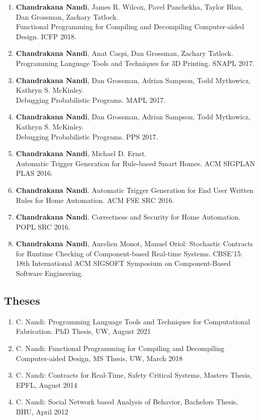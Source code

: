 \documentclass[margin, 10pt]{res} %
\begin{document}
\begin{resume}
\begin{enumerate}
  \item \textbf{Chandrakana Nandi}, James R. Wilcox, Pavel Panchekha, Taylor Blau, Dan Grossman, Zachary Tatlock. \\
    Functional Programming for Compiling and Decompiling Computer-aided Design. ICFP 2018.
  \item \textbf{Chandrakana Nandi}, Anat Caspi, Dan Grossman, Zachary Tatlock. \\
    Programming Language Tools and Techniques for 3D Printing. SNAPL 2017.

  \item \textbf{Chandrakana Nandi}, Dan Grossman, Adrian Sampson, Todd Mytkowicz, Kathryn S. McKinley. \\ Debugging Probabilistic Programs. MAPL 2017.
  \item \textbf{Chandrakana Nandi}, Dan Grossman, Adrian Sampson, Todd Mytkowicz, Kathryn S. McKinley. \\ Debugging Probabilistic Programs. PPS 2017.
\item \textbf{Chandrakana Nandi}, Michael D. Ernst. \\ Automatic Trigger Generation for Rule-based Smart Homes. ACM SIGPLAN PLAS 2016.
\item \textbf{Chandrakana Nandi}. Automatic Trigger Generation for End User Written Rules for Home Automation. ACM FSE SRC 2016.
\item \textbf{Chandrakana Nandi}. Correctness and Security for Home Automation. POPL SRC 2016.
\item \textbf{Chandrakana Nandi}, Aurelien Monot, Manuel Oriol: Stochastic Contracts for Runtime Checking of Component-based Real-time Systems. CBSE'15: 18th International ACM SIGSOFT Symposium on Component-Based Software Engineering.
\end{enumerate}
\subsection{Theses}
\begin{enumerate}
\item C. Nandi: Programming Language Tools and Techniques for Computational Fabrication. {PhD Thesis}, UW, August 2021
\item C. Nandi: Functional Programming for Compiling and Decompiling Computer-aided Design, {MS Thesis}, UW, March 2018
\item C. Nandi: Contracts for Real-Time, Safety Critical Systems, {Masters Thesis}, EPFL, August 2014
\item C. Nandi: Social Network based Analysis of Behavior, {Bachelors Thesis}, BHU, April 2012
\end{enumerate}


\end{resume}
\end{document}
